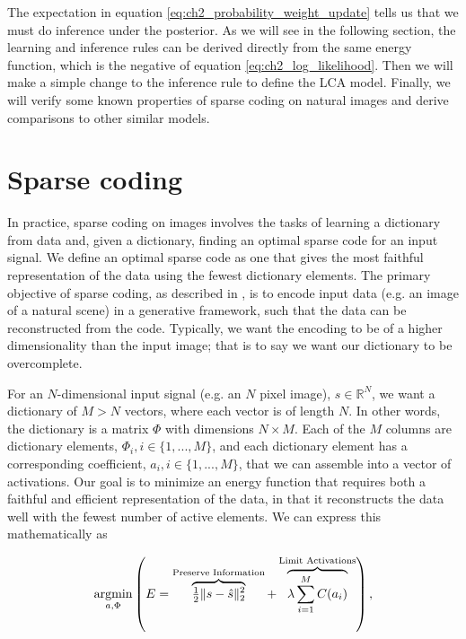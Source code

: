 The expectation in equation \ref{eq:ch2_probability_weight_update} tells us that we must do inference under the posterior. As we will see in the following section, the learning and inference rules can be derived directly from the same energy function, which is the negative of equation \ref{eq:ch2_log_likelihood}. Then we will make a simple change to the inference rule to define the LCA model. Finally, we will verify some known properties of sparse coding on natural images and derive comparisons to other similar models.


\section{Sparse coding}
In practice, sparse coding on images involves the tasks of learning a dictionary from data and, given a dictionary, finding an optimal sparse code for an input signal. We define an optimal sparse code as one that gives the most faithful representation of the data using the fewest dictionary elements. The primary objective of sparse coding, as described in \parencite{olshausen1997sparse}, is to encode input data (e.g. an image of a natural scene) in a generative framework, such that the data can be reconstructed from the code. Typically, we want the encoding to be of a higher dimensionality than the input image; that is to say we want our dictionary to be overcomplete.

For an $N$-dimensional input signal (e.g. an $N$ pixel image), $s \in \mathbb{R}^{N}$, we want a dictionary of $M > N$ vectors, where each vector is of length $N$. In other words, the dictionary is a matrix $\Phi$ with dimensions $N \times M$. Each of the $M$ columns are dictionary elements, $\Phi_{i}, i \in \{1,...,M\}$, and each dictionary element has a corresponding coefficient, $a_{i}, i \in \{1,...,M\}$, that we can assemble into a vector of activations. Our goal is to minimize an energy function that requires both a faithful and efficient representation of the data, in that it reconstructs the data well with the fewest number of active elements. We can express this mathematically as

\begin{equation}\label{eq:ch2_sparse_energy}
    \argmin\limits_{a, \Phi}
        \left( E =
            \overbrace{ \tfrac{1}{2} \| s - \hat{s} \|_{2}^{2} }^\text{Preserve Information} +
        \overbrace{ \lambda \sum\limits_{i=1}^{M}C(a_{i}) }^\text{Limit Activations} \right),
\end{equation}

